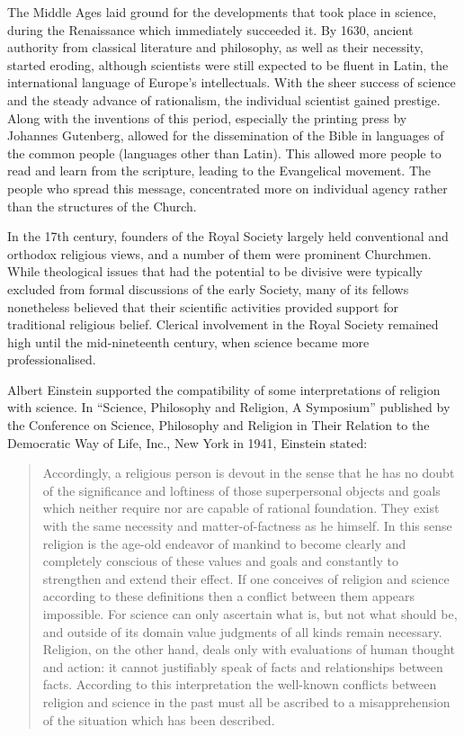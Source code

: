 \documentclass[
]{article}
\begin{document}
The Middle Ages laid ground for the developments that took place in
science, during the Renaissance which immediately succeeded it. By 1630,
ancient authority from classical literature and philosophy, as well as
their necessity, started eroding, although scientists were still
expected to be fluent in Latin, the international language of Europe's
intellectuals. With the sheer success of science and the steady advance
of rationalism, the individual scientist gained prestige. Along with the
inventions of this period, especially the printing press by Johannes
Gutenberg, allowed for the dissemination of the Bible in languages of
the common people (languages other than Latin). This allowed more people
to read and learn from the scripture, leading to the Evangelical
movement. The people who spread this message, concentrated more on
individual agency rather than the structures of the Church.

In the 17th century, founders of the Royal Society largely held
conventional and orthodox religious views, and a number of them were
prominent Churchmen. While theological issues that had the potential to
be divisive were typically excluded from formal discussions of the early
Society, many of its fellows nonetheless believed that their scientific
activities provided support for traditional religious belief. Clerical
involvement in the Royal Society remained high until the mid-nineteenth
century, when science became more professionalised.

Albert Einstein supported the compatibility of some interpretations of
religion with science. In ``Science, Philosophy and Religion, A
Symposium'' published by the Conference on Science, Philosophy and
Religion in Their Relation to the Democratic Way of Life, Inc., New York
in 1941, Einstein stated:

\begin{quote}
Accordingly, a religious person is devout in the sense that he has no
doubt of the significance and loftiness of those superpersonal objects
and goals which neither require nor are capable of rational foundation.
They exist with the same necessity and matter-of-factness as he himself.
In this sense religion is the age-old endeavor of mankind to become
clearly and completely conscious of these values and goals and
constantly to strengthen and extend their effect. If one conceives of
religion and science according to these definitions then a conflict
between them appears impossible. For science can only ascertain what is,
but not what should be, and outside of its domain value judgments of all
kinds remain necessary. Religion, on the other hand, deals only with
evaluations of human thought and action: it cannot justifiably speak of
facts and relationships between facts. According to this interpretation
the well-known conflicts between religion and science in the past must
all be ascribed to a misapprehension of the situation which has been
described.
\end{quote}
\end{document}
